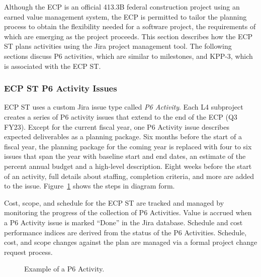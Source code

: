Although the ECP is an official 413.3B federal construction project using an earned value management system, the ECP is permitted to tailor the planning process to obtain the flexibility needed for a software project, the requirements of which are emerging as the project proceeds.  This section describes how the ECP ST plans activities using the Jira project management tool.  The following sections discuss P6 activities, which are similar to milestones, and KPP-3, which is associated with the ECP ST.


\subsubsection{ECP ST P6 Activity Issues}

ECP ST uses a custom Jira issue type called \textit{P6 Activity}.  Each L4 subproject creates a series of P6 activity issues that extend to the end of the ECP (Q3 FY23).  Except for the current fiscal year, one P6 Activity issue describes expected deliverables as a planning package.  Six months before the start of a fiscal year, the planning package for the coming year is replaced with four to six issues that span the year with baseline start and end dates, an estimate of the percent annual budget and a high-level description.  Eight weeks before the start of an activity, full details about staffing, completion criteria, and more are added to the issue.  Figure~\ref{fig:planning-process} shows the steps in diagram form.  

Cost, scope, and schedule for the ECP ST are tracked and managed by monitoring the progress of the collection of P6 Activities.  Value is accrued when a P6 Activity issue is marked ``Done'' in the Jira database.  Schedule and cost performance indices are derived from the status of the P6 Activities.  Schedule, cost, and scope changes against the plan are managed via a formal project change request process.

\begin{figure}
	\centering
	\caption{Example of a P6 Activity.} 
	\protect{}
	\label{fig:planning-process}
\end{figure}


